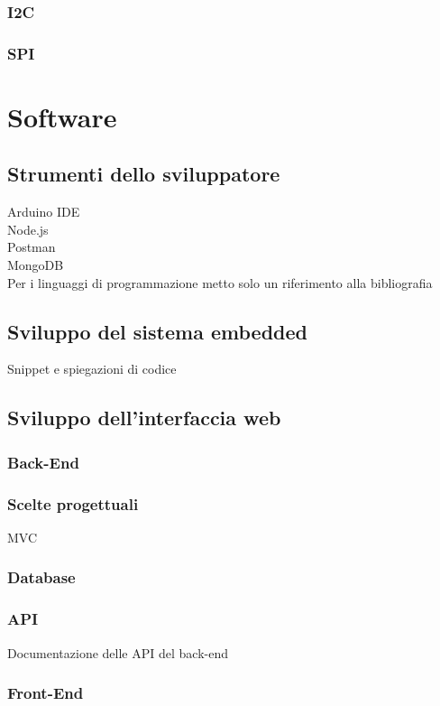 \documentclass[12pt]{report}
\begin{document}
%
\subsection{I2C}\label{sec:i2c}
%

%
\subsection{SPI}\label{sec:spi}
% 
\chapter{Software}
\label{cap3}
%
%
%
\section{Strumenti dello sviluppatore}
Arduino IDE
\\
Node.js
\\
Postman
\\
MongoDB 
\\
Per i linguaggi di programmazione metto solo un riferimento alla bibliografia
%
%
\section{Sviluppo del sistema embedded}
Snippet e spiegazioni di codice
\\

%
%
\section{Sviluppo dell'interfaccia web}
%
\subsection{Back-End}
\subsection*{Scelte progettuali}
MVC
\subsection*{Database}
%
\subsection*{API}
Documentazione delle API del back-end
%
\subsection{Front-End}
\end{document}
